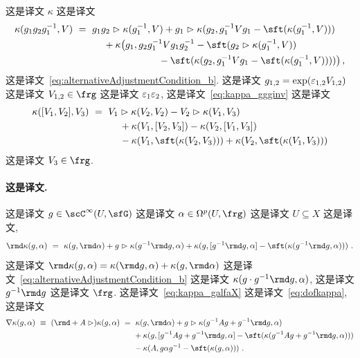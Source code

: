 \documentclass[
    affil-it, %
    auth-lg, %
    british, %
    compression, %
    contents, %
    custom-packages={}, %
    references={bigone}, %
]{lib/preprint}
\begin{document}
\begin{body}
 这是译文 $\kappa$ 这是译文         \begin{equation}\label{eq:kappa_ggginv}
        	\begin{aligned}
        		\kappa(g_1g_2g^{-1}_1,V)\ &=\ g_1g_2\acton\kappa(g_1^{-1},V)+g_1\acton\kappa(g_2,g_1^{-1}Vg_1-\sft(\kappa(g_1^{-1},V)))
        		\\
        		&\kern1cm+\kappa\big(g_1,g_2g_1^{-1}Vg_1g_2^{-1}-\sft(g_2\acton\kappa(g_1^{-1},V))
        		\\
        		&\kern3cm-\sft(\kappa(g_2,g_1^{-1}Vg_1-\sft(\kappa(g_1^{-1},V))))\big)\,,
        	\end{aligned}
        \end{equation}  这是译文~\eqref{eq:alternativeAdjustmentCondition_b}. 这是译文 $g_{1,2}=\exp(\varepsilon_{1,2}V_{1,2})$ 这是译文 $V_{1,2}\in\frg$ 这是译文 $\varepsilon_1\varepsilon_2$, 这是译文~\eqref{eq:kappa_ggginv} 这是译文 
        \begin{equation}\label{eq:kappa_commutator}
        	\begin{aligned}
        		\kappa([V_1,V_2],V_3)\ &=\ V_1\acton\kappa(V_2,V_2)-V_2\acton\kappa(V_1,V_3) 
        		\\
        		&\kern1cm+\kappa(V_1,[V_2,V_3])-\kappa(V_2,[V_1,V_3])
        		\\
        		&\kern1cm-\kappa(V_1,\sft(\kappa(V_2,V_3)))+\kappa(V_2,\sft(\kappa(V_1,V_3)))
        	\end{aligned}
        \end{equation}  这是译文 $V_3\in\frg$.
        
        \paragraph{这是译文.}
 这是译文 $g\in\scC^\infty(U,\sfG)$ 这是译文 $\alpha\in\Omega^p(U,\frg)$ 这是译文 $U\subseteq X$ 这是译文,         \begin{equation}\label{eq:dofkappa}
        	\rmd\kappa(g,\alpha)\ =\ \kappa(g,\rmd\alpha)+g\acton\kappa(g^{-1}\rmd g,\alpha)+\kappa(g,[g^{-1}\rmd g,\alpha]-\sft(\kappa(g^{-1}\rmd g,\alpha)))~.
        \end{equation}  这是译文 $\rmd\kappa(g,\alpha)=\kappa(\rmd g,\alpha)+\kappa(g,\rmd\alpha)$ 这是译文~\eqref{eq:alternativeAdjustmentCondition_b} 这是译文 $\kappa(g\cdot g^{-1}\rmd g,\alpha)$, 这是译文 $g^{-1}\rmd g$ 这是译文 $\frg$. 这是译文~\eqref{eq:kappa_galfaX} 这是译文~\eqref{eq:dofkappa}, 这是译文         \begin{equation}
        	\begin{aligned}
        		\nabla\kappa(g,\alpha)\ \equiv\ (\rmd+A\acton)\kappa(g,\alpha)\ &=\ \kappa(g,\rmd\alpha)+g\acton\kappa(g^{-1}Ag+g^{-1}\rmd g,\alpha) 
        		\\
        		&\kern0.5cm+\kappa(g,[g^{-1}Ag+g^{-1}\rmd g,\alpha]-\sft(\kappa(g^{-1}Ag+g^{-1}\rmd g,\alpha)))
        		\\
        		&\kern0.5cm-\kappa(A,g\alpha g^{-1}-\sft(\kappa(g,\alpha)))~. 
        	\end{aligned}
        \end{equation}
        

\end{body}
\end{document}
